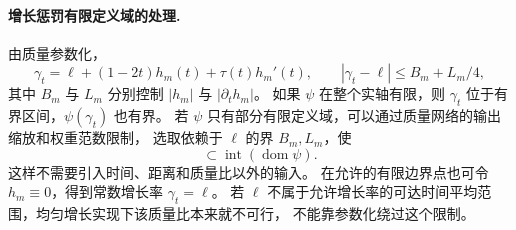 \documentclass[UTF8,a4paper,11pt,fontset=fandol]{ctexart}
\begin{document}
\paragraph{增长惩罚有限定义域的处理.}
由质量参数化，
\begin{equation}
\gamma_t=\ell+(1-2t)h_m(t)+\tau(t)h_m'(t),
\qquad |\gamma_t-\ell|\le B_m+L_m/4,
\end{equation}
其中 $B_m$ 与 $L_m$ 分别控制 $|h_m|$ 与 $|\partial_t h_m|$。
如果 $\psi$ 在整个实轴有限，则 $\gamma_t$ 位于有界区间，$\psi(\gamma_t)$ 也有界。
若 $\psi$ 只有部分有限定义域，可以通过质量网络的输出缩放和权重范数限制，
选取依赖于 $\ell$ 的界 $B_m,L_m$，使
\begin{equation}
[\ell-(B_m+L_m/4),\ \ell+(B_m+L_m/4)]
\subset\operatorname{int}(\operatorname{dom}\psi).
\end{equation}
这样不需要引入时间、距离和质量比以外的输入。
在允许的有限边界点也可令 $h_m\equiv0$，得到常数增长率 $\gamma_t=\ell$。
若 $\ell$ 不属于允许增长率的可达时间平均范围，均匀增长实现下该质量比本来就不可行，
不能靠参数化绕过这个限制。
\end{document}
